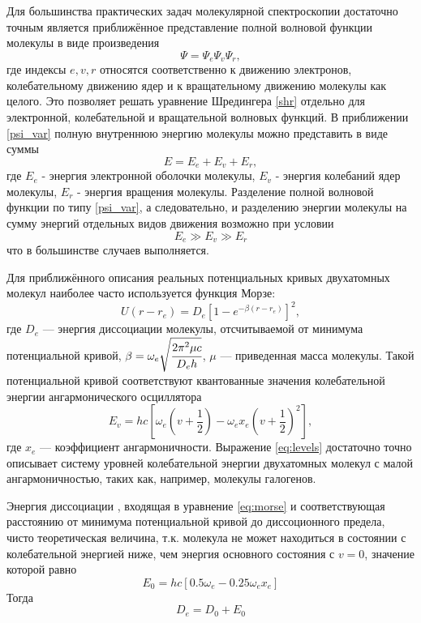 Для большинства практических задач молекулярной спектроскопии достаточно
точным является приближённое представление полной волновой функции
молекулы в виде произведения
\begin{equation}
\label{psi_var}
\Psi = \Psi_e\Psi_v\Psi_r,
\end{equation}
где индексы $e, v, r$ относятся соответственно к движению электронов,
колебательному движению ядер и к вращательному движению молекулы как
целого. Это позволяет решать уравнение Шредингера \eqref{shr} отдельно для
электронной, колебательной и вращательной волновых функций. В
приближении \eqref{psi_var} полную внутреннюю энергию молекулы можно представить в виде суммы
\begin{equation}
\label{energy}E = E_e+ E_v+E_r,
\end{equation}
где $E_e$ - энергия электронной оболочки молекулы, $E_v$ - энергия колебаний ядер молекулы, $E_r$ - энергия вращения молекулы. Разделение полной волновой функции по типу \eqref{psi_var}, а следовательно, и разделению энергии молекулы на сумму энергий отдельных видов движения возможно при
условии
\begin{equation}
E_e \gg E_v \gg E_r
\end{equation}
что в большинстве случаев выполняется.

Для приближённого описания реальных потенциальных кривых двухатомных молекул наиболее часто используется функция Морзе:
\begin{equation}
\label{eq:morse}
U(r-r_e) = D_e\left[1-e^{-\beta(r-r_e)}\right]^2,
\end{equation}
где $D_e$ --- энергия диссоциации молекулы, отсчитываемой от минимума потенциальной кривой, $\beta = \omega_e \sqrt{\cfrac{2\pi^2\mu c}{D_e h}}$, $\mu$ --- приведенная масса молекулы. Такой потенциальной кривой соответствуют квантованные значения колебательной энергии ангармонического осциллятора
\begin{equation}
\label{eq:levels}
E_v=hc\left[\omega_e\left(v+\frac{1}{2}\right)-\omega_e x_e\left(v+\frac{1}{2}\right)^2\right],
\end{equation}
где $x_e$ --- коэффициент ангармоничности. Выражение \eqref{eq:levels} достаточно точно описывает систему уровней колебательной энергии двухатомных молекул с малой ангармоничностью, таких как, например, молекулы галогенов.

Энергия диссоциации , входящая в уравнение \eqref{eq:morse} и соответствующая
расстоянию от минимума потенциальной кривой до диссоционного предела, чисто теоретическая величина, т.к. молекула не может находиться в
состоянии с колебательной энергией ниже, чем энергия основного состояния с
$v = 0$, значение которой равно
\begin{equation}
E_0 = hc\left[0.5\omega_e-0.25\omega_e x_e\right]
\end{equation}
Тогда
\begin{equation}
D_e = D_0 + E_0
\end{equation}

